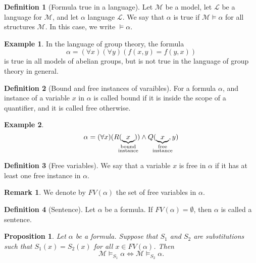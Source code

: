 \documentclass[11pt,a4paper]{article}
\theoremstyle{definition}
\newtheorem{definition}{Definition}[section]
\newtheorem{remark}{Remark}[section]
\newtheorem{example}{Example}[section]
\theoremstyle{plain}
\newtheorem{proposition}[theorem]{Proposition}
\newcommand{\M}{\mathcal{M}}
\renewcommand{\L}{\mathcal{L}}
\begin{document}
  \begin{definition}[Formula true in a language]
    Let $\M$ be a model, let $\L$ be a language for $\M$, 
    and let $\alpha$ language $\L$.
    We say that $\alpha$ is true if $\M \models \alpha$ for all
    structures $\M$.
    In this case, we write $\models \alpha$.
  \end{definition}

  \begin{example}
    In the language of group theory, the formula
    \[
      \alpha = (\forall x)(\forall y)(f(x,y) = f(y,x))
    \]
    is true in all models of abelian groups, but is not true in the language
    of group theory in general.
  \end{example}

  \begin{definition}[Bound and free instances of varaibles]
    For a formula $\alpha$, and instance of a variable $x$ in $\alpha$
    is called bound if it is inside the scope of a quantifier, and it is called
    free otherwise.
  \end{definition}

  \begin{example}
    \[
      \alpha = (\forall x)(R(\underbrace{x}_{\mathclap{
      \substack{\text{bound} \\ \text{instance}}}})) 
      \land Q(\underbrace{x}_{\mathclap{
      \substack{\text{free} \\ \text{instance}}}},y)
    \]
  \end{example}

  \begin{definition}[Free variables]
    We say that a variable $x$ is free in $\alpha$ if it has at least one 
    free instance in $\alpha$.
  \end{definition}
  \begin{remark}
    We denote by $FV(\alpha)$ the set of free variables in $\alpha$.
  \end{remark}

  \begin{definition}[Sentence]
    Let $\alpha$ be a formula.
    If $FV(\alpha) = \emptyset$, then $\alpha$ is called a sentence.
  \end{definition}

  \begin{proposition}
    Let $\alpha$ be a formula.
    Suppose that $S_1$ and $S_2$ are substitutions such that $S_1(x) = S_2(x)$
    for all $x \in FV(\alpha)$.
    Then
    \[
      \M \models_{S_1} \alpha \iff
      \M \models_{S_2} \alpha.
    \]
  \end{proposition}
\end{document}
